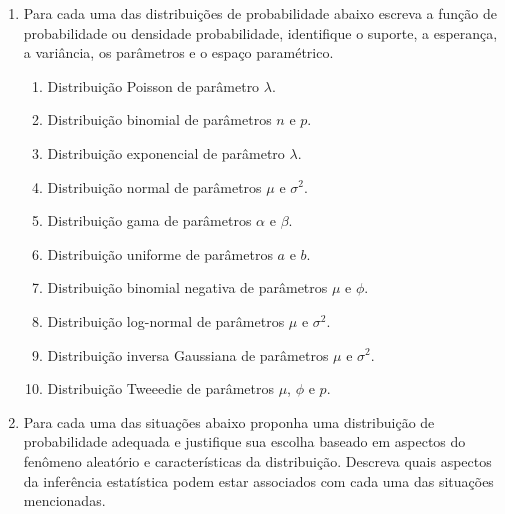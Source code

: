 \documentclass[
  9pt,
  a5paper,
]{book}
\providecommand{\tightlist}{%
  \setlength{\itemsep}{0pt}\setlength{\parskip}{0pt}}
\theoremstyle{definition}
\theoremstyle{definition}
\theoremstyle{definition}
\theoremstyle{definition}
\theoremstyle{remark}
\begin{document}
\begin{enumerate}
\def\labelenumi{\arabic{enumi}.}
\tightlist
\item
  Para cada uma das distribuições de probabilidade abaixo escreva a
  função de probabilidade ou densidade probabilidade, identifique
  o suporte, a esperança, a variância, os parâmetros e o espaço paramétrico.

  \begin{enumerate}
  \def\labelenumii{\alph{enumii})}
  \tightlist
  \item
    Distribuição Poisson de parâmetro \(\lambda\).
  \item
    Distribuição binomial de parâmetros \(n\) e \(p\).
  \item
    Distribuição exponencial de parâmetro \(\lambda\).
  \item
    Distribuição normal de parâmetros \(\mu\) e \(\sigma^2\).
  \item
    Distribuição gama de parâmetros \(\alpha\) e \(\beta\).
  \item
    Distribuição uniforme de parâmetros \(a\) e \(b\).
  \item
    Distribuição binomial negativa de parâmetros \(\mu\) e \(\phi\).
  \item
    Distribuição log-normal de parâmetros \(\mu\) e \(\sigma^2\).
  \item
    Distribuição inversa Gaussiana de parâmetros \(\mu\) e \(\sigma^2\).
  \item
    Distribuição Tweeedie de parâmetros \(\mu\), \(\phi\) e \(p\).
  \end{enumerate}
\item
  Para cada uma das situações abaixo proponha uma distribuição de probabilidade
  adequada e justifique sua escolha baseado em aspectos do fenômeno aleatório e
  características da distribuição. Descreva quais aspectos da inferência estatística podem estar associados com cada uma das situações mencionadas.


\end{enumerate}
\end{document}
